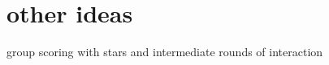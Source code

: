 \documentclass{article}
\begin{document}
\section{other ideas}
group scoring with stars and intermediate rounds of interaction

\end{document}
